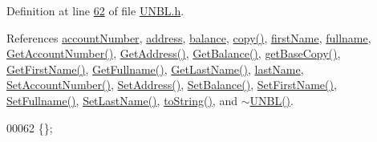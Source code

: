 Definition at line \hyperlink{_u_n_b_l_8h_source_l00062}{62} of file \hyperlink{_u_n_b_l_8h_source}{U\+N\+B\+L.\+h}.



References \hyperlink{_u_n_b_l_8h_source_l00095}{account\+Number}, \hyperlink{_u_n_b_l_8h_source_l00097}{address}, \hyperlink{_u_n_b_l_8h_source_l00096}{balance}, \hyperlink{_u_n_b_l_8cpp_source_l00033}{copy()}, \hyperlink{_u_n_b_l_8h_source_l00093}{first\+Name}, \hyperlink{_u_n_b_l_8h_source_l00092}{fullname}, \hyperlink{_u_n_b_l_8cpp_source_l00078}{Get\+Account\+Number()}, \hyperlink{_u_n_b_l_8cpp_source_l00062}{Get\+Address()}, \hyperlink{_u_n_b_l_8cpp_source_l00070}{Get\+Balance()}, \hyperlink{_u_n_b_l_8cpp_source_l00021}{get\+Base\+Copy()}, \hyperlink{_u_n_b_l_8cpp_source_l00094}{Get\+First\+Name()}, \hyperlink{_u_n_b_l_8cpp_source_l00102}{Get\+Fullname()}, \hyperlink{_u_n_b_l_8cpp_source_l00086}{Get\+Last\+Name()}, \hyperlink{_u_n_b_l_8h_source_l00094}{last\+Name}, \hyperlink{_u_n_b_l_8cpp_source_l00074}{Set\+Account\+Number()}, \hyperlink{_u_n_b_l_8cpp_source_l00058}{Set\+Address()}, \hyperlink{_u_n_b_l_8cpp_source_l00066}{Set\+Balance()}, \hyperlink{_u_n_b_l_8cpp_source_l00090}{Set\+First\+Name()}, \hyperlink{_u_n_b_l_8cpp_source_l00098}{Set\+Fullname()}, \hyperlink{_u_n_b_l_8cpp_source_l00082}{Set\+Last\+Name()}, \hyperlink{_u_n_b_l_8cpp_source_l00053}{to\+String()}, and \hyperlink{_u_n_b_l_8cpp_source_l00014}{$\sim$\+U\+N\+B\+L()}.


\begin{DoxyCode}
00062 \{\};
\end{DoxyCode}


